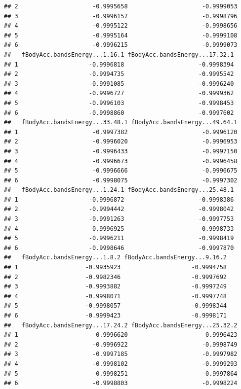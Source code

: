 \documentclass[
]{article}
\begin{document}
\begin{verbatim}
## 2                     -0.9995658                     -0.9999053
## 3                     -0.9996157                     -0.9998796
## 4                     -0.9995122                     -0.9998656
## 5                     -0.9995164                     -0.9999108
## 6                     -0.9996215                     -0.9999073
##   fBodyAcc.bandsEnergy...1.16.1 fBodyAcc.bandsEnergy...17.32.1
## 1                    -0.9996818                     -0.9998394
## 2                    -0.9994735                     -0.9995542
## 3                    -0.9991085                     -0.9996240
## 4                    -0.9996727                     -0.9999362
## 5                    -0.9996103                     -0.9998453
## 6                    -0.9998860                     -0.9997602
##   fBodyAcc.bandsEnergy...33.48.1 fBodyAcc.bandsEnergy...49.64.1
## 1                     -0.9997382                     -0.9996120
## 2                     -0.9996020                     -0.9996953
## 3                     -0.9996433                     -0.9997150
## 4                     -0.9996673                     -0.9996458
## 5                     -0.9996666                     -0.9996675
## 6                     -0.9998075                     -0.9997302
##   fBodyAcc.bandsEnergy...1.24.1 fBodyAcc.bandsEnergy...25.48.1
## 1                    -0.9996872                     -0.9998386
## 2                    -0.9994442                     -0.9998042
## 3                    -0.9991263                     -0.9997753
## 4                    -0.9996925                     -0.9998733
## 5                    -0.9996211                     -0.9998419
## 6                    -0.9998646                     -0.9997870
##   fBodyAcc.bandsEnergy...1.8.2 fBodyAcc.bandsEnergy...9.16.2
## 1                   -0.9935923                    -0.9994758
## 2                   -0.9982346                    -0.9997692
## 3                   -0.9993882                    -0.9997249
## 4                   -0.9998071                    -0.9997748
## 5                   -0.9998057                    -0.9998344
## 6                   -0.9999423                    -0.9998171
##   fBodyAcc.bandsEnergy...17.24.2 fBodyAcc.bandsEnergy...25.32.2
## 1                     -0.9996620                     -0.9996423
## 2                     -0.9996922                     -0.9998749
## 3                     -0.9997185                     -0.9997982
## 4                     -0.9998102                     -0.9999293
## 5                     -0.9998251                     -0.9997864
## 6                     -0.9998803                     -0.9998224

\end{verbatim}
\end{document}
